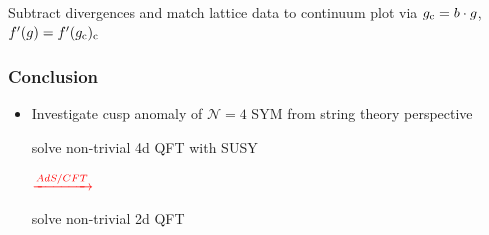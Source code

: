 \documentclass{beamer}
\begin{document}

\begin{frame}[plain]
Subtract divergences and match lattice data to continuum plot via $g_{\rm c} = b \cdot g$, $f'(g)=f'(g_{\rm c})_{\rm c}$

\begin{center}

\end{center}
\end{frame}



\begin{frame}
\frametitle{Conclusion}

\begin{itemize}
\item<1-> Investigate cusp anomaly of $\mathcal{N}=4$ SYM from string theory perspective\\[2mm]
\begin{minipage}{0.38\linewidth}
\begin{center}
solve non-trivial 4d QFT with SUSY
\end{center}
\end{minipage}
\begin{minipage}{0.18\linewidth}
$\xrightarrow{\color{red} AdS/CFT}{}$
\end{minipage}
\begin{minipage}{0.38\linewidth}
solve non-trivial 2d QFT
\end{minipage}
\vspace{2mm}

\end{itemize}
\end{frame}
\end{document}
